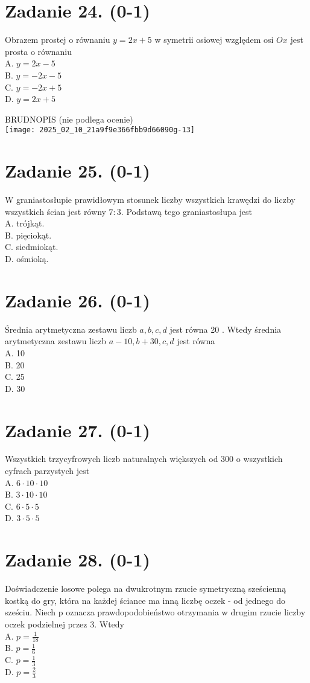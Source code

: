 \documentclass[10pt]{article}
\begin{document}
\section*{Zadanie 24. (0-1)}
Obrazem prostej o równaniu \(y=2 x+5\) w symetrii osiowej względem osi \(O x\) jest prosta o równaniu\\
A. \(y=2 x-5\)\\
B. \(y=-2 x-5\)\\
C. \(y=-2 x+5\)\\
D. \(y=2 x+5\)

BRUDNOPIS (nie podlega ocenie)\\
\texttt{[image: 2025\_02\_10\_21a9f9e366fbb9d66090g-13]}

\section*{Zadanie 25. (0-1)}
W graniastosłupie prawidłowym stosunek liczby wszystkich krawędzi do liczby wszystkich ścian jest równy \(7: 3\). Podstawą tego graniastosłupa jest\\
A. trójkąt.\\
B. pięciokąt.\\
C. siedmiokąt.\\
D. ośmioką.

\section*{Zadanie 26. (0-1)}
Średnia arytmetyczna zestawu liczb \(a, b, c, d\) jest równa 20 . Wtedy średnia arytmetyczna zestawu liczb \(a-10, b+30, c, d\) jest równa\\
A. 10\\
B. 20\\
C. 25\\
D. 30

\section*{Zadanie 27. (0-1)}
Wszystkich trzycyfrowych liczb naturalnych większych od 300 o wszystkich cyfrach parzystych jest\\
A. \(6 \cdot 10 \cdot 10\)\\
B. \(3 \cdot 10 \cdot 10\)\\
C. \(6 \cdot 5 \cdot 5\)\\
D. \(3 \cdot 5 \cdot 5\)

\section*{Zadanie 28. (0-1)}
Doświadczenie losowe polega na dwukrotnym rzucie symetryczną sześcienną kostką do gry, która na każdej ściance ma inną liczbę oczek - od jednego do sześciu. Niech p oznacza prawdopodobieństwo otrzymania w drugim rzucie liczby oczek podzielnej przez 3. Wtedy\\
A. \(p=\frac{1}{18}\)\\
B. \(p=\frac{1}{6}\)\\
C. \(p=\frac{1}{3}\)\\
D. \(p=\frac{2}{3}\)
\end{document}
